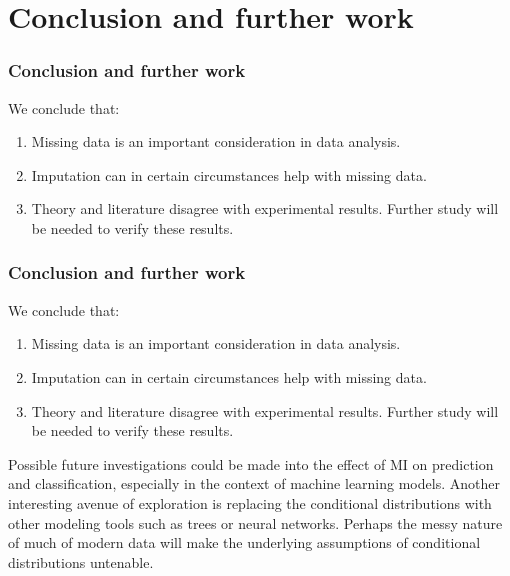 \documentclass{beamer}
\begin{document}
\section{Conclusion and further work}
\begin{frame}
\frametitle{Conclusion and further work}
We conclude that:
\begin{enumerate}
	\item<1-> Missing data is an important consideration in data analysis.
	\item<2-> Imputation can in certain circumstances help with missing data.
	\item<3-> Theory and literature disagree with experimental results. Further study will be needed to verify these results.
\end{enumerate}
\end{frame}

\begin{frame}
\frametitle{Conclusion and further work}
We conclude that:
\begin{enumerate}
	\item Missing data is an important consideration in data analysis.
	\item Imputation can in certain circumstances help with missing data.
	\item Theory and literature disagree with experimental results. Further study will be needed to verify these results.
\end{enumerate}
Possible future investigations could be made into the effect of MI on prediction and classification, especially in the context of machine learning models. Another interesting avenue of exploration is replacing the conditional distributions with other modeling tools such as trees or neural networks. Perhaps the messy nature of much of modern data will make the underlying assumptions of conditional distributions untenable.
\end{frame}

	

\end{document}
